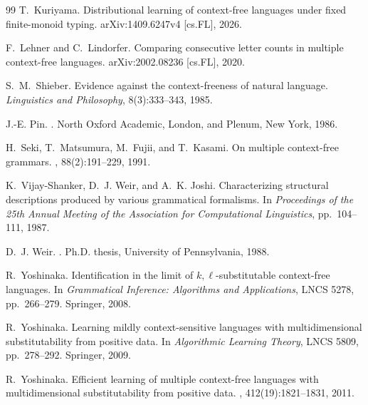 \documentclass[11pt,a4paper]{ltjsarticle}
\theoremstyle{remark}
\begin{document}
\begin{thebibliography}{99}
T.~Kuriyama.
\newblock Distributional learning of context-free languages under fixed finite-monoid typing.
\newblock arXiv:1409.6247v4 [cs.FL], 2026.

F.~Lehner and C.~Lindorfer.
\newblock Comparing consecutive letter counts in multiple context-free languages.
\newblock arXiv:2002.08236 [cs.FL], 2020.

S.~M.~Shieber.
\newblock Evidence against the context-freeness of natural language.
\newblock \emph{Linguistics and Philosophy}, 8(3):333--343, 1985.

J.-E. Pin.
.
\newblock North Oxford Academic, London, and Plenum, New York, 1986.

H.~Seki, T.~Matsumura, M.~Fujii, and T.~Kasami.
\newblock On multiple context-free grammars.
, 88(2):191--229, 1991.

K.~Vijay-Shanker, D.~J. Weir, and A.~K. Joshi.
\newblock Characterizing structural descriptions produced by various grammatical formalisms.
\newblock In {\em Proceedings of the 25th Annual Meeting of the Association for
Computational Linguistics}, pp.~104--111, 1987.

D.~J. Weir.
.
\newblock Ph.D. thesis, University of Pennsylvania, 1988.

R.~Yoshinaka.
\newblock Identification in the limit of \(k,\ell\)-substitutable context-free
languages.
\newblock In {\em Grammatical Inference: Algorithms and Applications}, LNCS
5278, pp.~266--279. Springer, 2008.

R.~Yoshinaka.
\newblock Learning mildly context-sensitive languages with multidimensional
substitutability from positive data.
\newblock In {\em Algorithmic Learning Theory}, LNCS 5809, pp.~278--292.
Springer, 2009.

R.~Yoshinaka.
\newblock Efficient learning of multiple context-free languages with
multidimensional substitutability from positive data.
, 412(19):1821--1831, 2011.

\end{thebibliography}
\end{document}
